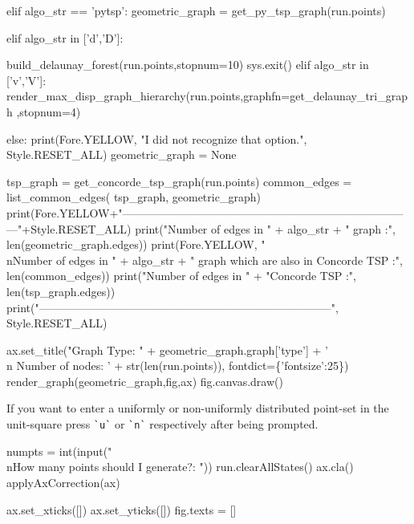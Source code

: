 elif algo_str == 'pytsp':
     geometric_graph = get_py_tsp_graph(run.points)

elif algo_str in ['d','D']:

     build_delaunay_forest(run.points,stopnum=10) 
     sys.exit()
elif algo_str in ['v','V']:
     render_max_disp_graph_hierarchy(run.points,graphfn=get_delaunay_tri_graph ,stopnum=4)

else:
      print(Fore.YELLOW, "I did not recognize that option.", Style.RESET_ALL)
      geometric_graph = None

tsp_graph = get_concorde_tsp_graph(run.points)
common_edges = list_common_edges( tsp_graph, geometric_graph)
print(Fore.YELLOW+"------------------------------------------------------------------------------"+Style.RESET_ALL)
print("Number of edges in " + algo_str + " graph                                :", len(geometric_graph.edges))
print(Fore.YELLOW, "\\nNumber of edges in " + algo_str + " graph which are also in Concorde TSP :", len(common_edges))
print("Number of edges in " + "Concorde TSP                              :", len(tsp_graph.edges))
print("------------------------------------------------------------------------------", Style.RESET_ALL)


ax.set_title("Graph Type: " + geometric_graph.graph['type'] + '\\n Number of nodes: ' + str(len(run.points)), fontdict=\{'fontsize':25\})
render_graph(geometric_graph,fig,ax)
fig.canvas.draw()
\nwendcode{}\nwdocspar

If you want to enter a uniformly or non-uniformly distributed point-set in the unit-square press \verb|`u`| or \verb|`n`|
respectively after being prompted. 

\nwenddocs{}\endmoddef\nwstartdeflinemarkup{}\nwenddeflinemarkup
numpts = int(input("\\nHow many points should I generate?: ")) 
run.clearAllStates()
ax.cla()
applyAxCorrection(ax)

ax.set_xticks([])
ax.set_yticks([])
fig.texts = []
                 
